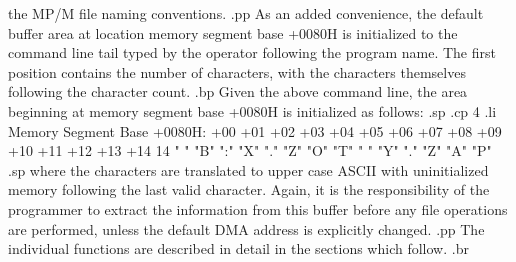the MP/M file naming conventions.
.pp
As an added convenience, the default buffer area at location
memory segment base +0080H is initialized to the command line tail
typed by the operator following the program name.  The first
position contains the number of characters, with the characters
themselves following the character count.
.bp
Given the above
command line, the area beginning at memory segment base +0080H is
initialized as follows:
.sp
.cp 4
.li
   Memory Segment Base +0080H:
   +00 +01 +02 +03 +04 +05 +06 +07 +08 +09 +10 +11 +12 +13 +14
    14 " " "B" ":" "X" "." "Z" "O" "T" " " "Y" "." "Z" "A" "P"
.sp
where the characters are translated to upper case ASCII with
uninitialized memory following the last valid character.
Again, it is the responsibility of the programmer to extract
the information from this buffer before any file operations
are performed, unless the default DMA address is explicitly
changed.
.pp
The individual functions are described in detail in the sections
which follow.
.br
